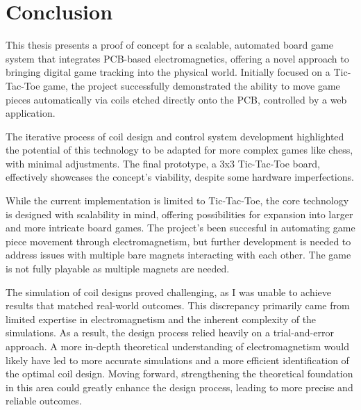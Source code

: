 \chapter*{Conclusion}


This thesis presents a proof of concept for a scalable, automated board game system that integrates PCB-based electromagnetics, offering a novel approach to bringing digital game tracking into the physical world. Initially focused on a Tic-Tac-Toe game, the project successfully demonstrated the ability to move game pieces automatically via coils etched directly onto the PCB, controlled by a web application.

The iterative process of coil design and control system development highlighted the potential of this technology to be adapted for more complex games like chess, with minimal adjustments. The final prototype, a 3x3 Tic-Tac-Toe board, effectively showcases the concept’s viability, despite some hardware imperfections.

While the current implementation is limited to Tic-Tac-Toe, the core technology is designed with scalability in mind, offering possibilities for expansion into larger and more intricate board games. The project's been succesful in automating game piece movement through electromagnetism, but further development is needed to address issues with multiple bare magnets interacting with each other. The game is not fully playable as multiple magnets are needed.

The simulation of coil designs proved challenging, as I was unable to achieve results that matched real-world outcomes. This discrepancy primarily came from limited expertise in electromagnetism and the inherent complexity of the simulations. As a result, the design process relied heavily on a trial-and-error approach. A more in-depth theoretical understanding of electromagnetism would likely have led to more accurate simulations and a more efficient identification of the optimal coil design. Moving forward, strengthening the theoretical foundation in this area could greatly enhance the design process, leading to more precise and reliable outcomes.